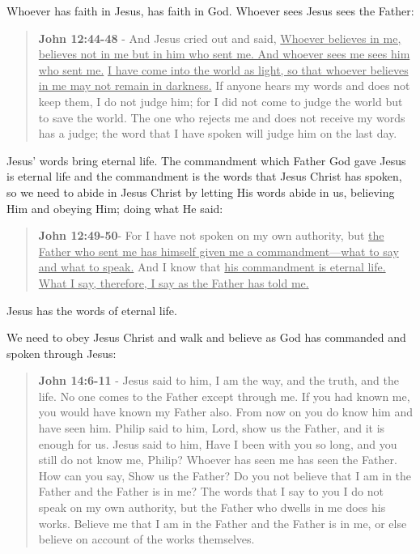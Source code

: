 \documentclass[11pt]{article}
\begin{document}
Whoever has faith in Jesus, has faith in God. Whoever sees Jesus sees the Father:

\begin{quote}
\textbf{John 12:44-48} - And Jesus cried out and said, \uline{Whoever believes in me, believes not in me but in him who sent me. And whoever sees me sees him who sent me.} \uline{I have come into the world as light, so that whoever believes in me may not remain in darkness.} If anyone hears my words and does not keep them, I do not judge him; for I did not come to judge the world but to save the world. The one who rejects me and does not receive my words has a judge; the word that I have spoken will judge him on the last day.
\end{quote}

Jesus' words bring eternal life. The commandment which Father God gave Jesus is eternal life and the commandment is the words that Jesus Christ has spoken, so we need to abide in Jesus Christ by letting His words abide in us, believing Him and obeying Him; doing what He said:

\begin{quote}
\textbf{John 12:49-50}- For I have not spoken on my own authority, but \uline{the Father who sent me has himself given me a commandment—what to say and what to speak.} And I know that \uline{his commandment is eternal life. What I say, therefore, I say as the Father has told me.}
\end{quote}

Jesus has the words of eternal life.

We need to obey Jesus Christ and walk and believe as God has commanded and spoken through Jesus:

\begin{quote}
\textbf{John 14:6-11} - Jesus said to him, I am the way, and the truth, and the life. No one comes to the Father except through me. If you had known me, you would have known my Father also. From now on you do know him and have seen him. Philip said to him, Lord, show us the Father, and it is enough for us. Jesus said to him, Have I been with you so long, and you still do not know me, Philip? Whoever has seen me has seen the Father. How can you say, Show us the Father? Do you not believe that I am in the Father and the Father is in me? The words that I say to you I do not speak on my own authority, but the Father who dwells in me does his works. Believe me that I am in the Father and the Father is in me, or else believe on account of the works themselves.
\end{quote}
\end{document}

